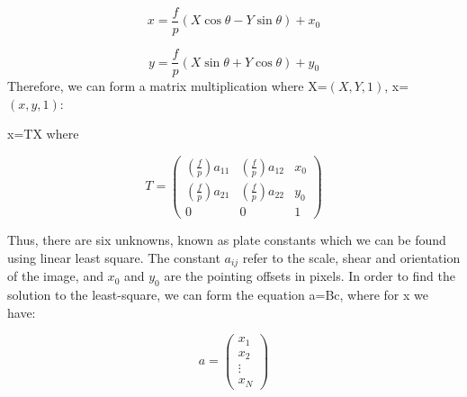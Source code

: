 \documentclass[letterpaper,12pt]{article}
\begin{document}
\begin{equation}
x=\frac{f}{p}(X\cos\theta - Y\sin\theta)+x_{0}

\end{equation}

\begin{equation}
y=\frac{f}{p}(X\sin\theta + Y\cos\theta)+y_{0}

\end{equation}
Therefore, we can form a matrix multiplication where X=\begin{math} (X,Y,1) \end{math}, x=\begin{math} (x,y,1) \end{math}:

x=TX
where

\begin{equation}
T=
\begin{pmatrix}
  (\frac{f}{p})a_{11}  & (\frac{f}{p})a_{12}  & x_{0} \\
  (\frac{f}{p})a_{21}  & (\frac{f}{p})a_{22}  & y_{0} \\
  0 & 0 & 1
 \end{pmatrix}
\end{equation}

Thus, there are six unknowns, known as plate constants which we can be found using linear least square. The constant \begin{math} a_{ij} \end{math} refer to the scale, shear and orientation of the image, and \begin{math} x_{0} \end{math} and \begin{math} y_{0} \end{math} are the pointing offsets in pixels.
In order to find the solution to the least-square, we can form the equation a=Bc, 
where for x we have:

\begin{equation}
a=
\begin{pmatrix}
  x_{1} \\
  x_{2} \\
  \vdots \\
  x_{N} 
 \end{pmatrix}
\end{equation}
\end{document}

